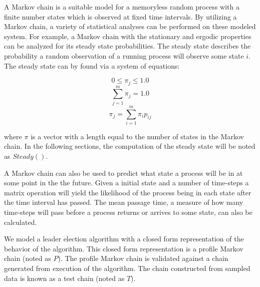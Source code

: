 A Markov chain is a suitable model for a memoryless random process with a finite number states which is observed at fixed time intervals.
By utilizing a Markov chain, a variety of statistical analyses can be performed on these modeled system.
For example, a Markov chain with the stationary and ergodic properties can be analyzed for its steady state probabilities.
The steady state describes the probability a random observation of a running process will observe some state $i$.
The steady state can by found via a system of equations: \cite{MARKOV3}

\[  0\leq\pi_j\leq1.0 \]
\[	\sum_{j = 1}^{m}\pi_j = 1.0 \]
\[	\pi_j = \sum_{i=1}^{m} \pi_i p_{ij} \]

where $\pi$ is a vector with a length equal to the number of states in the Markov chain.
In the following sections, the computation of the steady state will be noted as $Steady()$.

A Markov chain can also be used to predict what state a process will be in at some point in the the future.
Given a initial state and a number of time-steps a matrix operation will yield the likelihood of the process being in each state after the time interval has passed.
The mean passage time, a measure of how many time-steps will pass before a process returns or arrives to some state, can also be calculated.

We model a leader election algorithm with a closed form representation of the behavior of the algorithm.
This closed form representation is a profile Markov chain (noted as $P$).
The profile Markov chain is validated against a chain generated from execution of the algorithm.
The chain constructed from sampled data is known as a test chain (noted as $T$).
